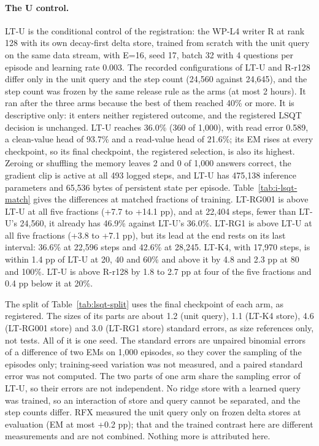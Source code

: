 \paragraph{The U control.}
LT-U is the conditional control of the registration: the WP-L4 writer R at rank 128 with its own decay-first delta store, trained from scratch with the unit query on the same data stream, with E=16, seed 17, batch 32 with 4 questions per episode and learning rate 0.003.
The recorded configurations of LT-U and R-r128 differ only in the unit query and the step count (24,560 against 24,645), and the step count was frozen by the same release rule as the arms (at most 2 hours).
It ran after the three arms because the best of them reached 40\% or more.
It is descriptive only: it enters neither registered outcome, and the registered LSQT decision is unchanged.
LT-U reaches 36.0\% (360 of 1,000), with read error 0.589, a clean-value head of 93.7\% and a read-value head of 21.6\%; its EM rises at every checkpoint, so its final checkpoint, the registered selection, is also its highest.  %
Zeroing or shuffling the memory leaves 2 and 0 of 1,000 answers correct, the gradient clip is active at all 493 logged steps, and LT-U has 475,138 inference parameters and 65,536 bytes of persistent state per episode.  %
Table~\ref{tab:i-lsqt-match} gives the differences at matched fractions of training.
LT-RG001 is above LT-U at all five fractions (+7.7 to +14.1 pp), and at 22,404 steps, fewer than LT-U's 24,560, it already has 46.9\% against LT-U's 36.0\%.
LT-RG1 is above LT-U at all five fractions (+3.8 to +7.1 pp), but its lead at the end rests on its last interval: 36.6\% at 22,596 steps and 42.6\% at 28,245.
LT-K4, with 17,970 steps, is within 1.4 pp of LT-U at 20, 40 and 60\% and above it by 4.8 and 2.3 pp at 80 and 100\%.
LT-U is above R-r128 by 1.8 to 2.7 pp at four of the five fractions and 0.4 pp below it at 20\%.  %

\lsqtmatchtable

The split of Table~\ref{tab:lsqt-split} uses the final checkpoint of each arm, as registered.
The sizes of its parts are about 1.2 (unit query), 1.1 (LT-K4 store), 4.6 (LT-RG001 store) and 3.0 (LT-RG1 store) standard errors, as size references only, not tests.
All of it is one seed.
The standard errors are unpaired binomial errors of a difference of two EMs on 1,000 episodes, so they cover the sampling of the episodes only; training-seed variation was not measured, and a paired standard error was not computed.
The two parts of one arm share the sampling error of LT-U, so their errors are not independent.
No ridge store with a learned query was trained, so an interaction of store and query cannot be separated, and the step counts differ.
RFX measured the unit query only on frozen delta stores at evaluation (EM at most +0.2 pp); that and the trained contrast here are different measurements and are not combined.
Nothing more is attributed here.  %
